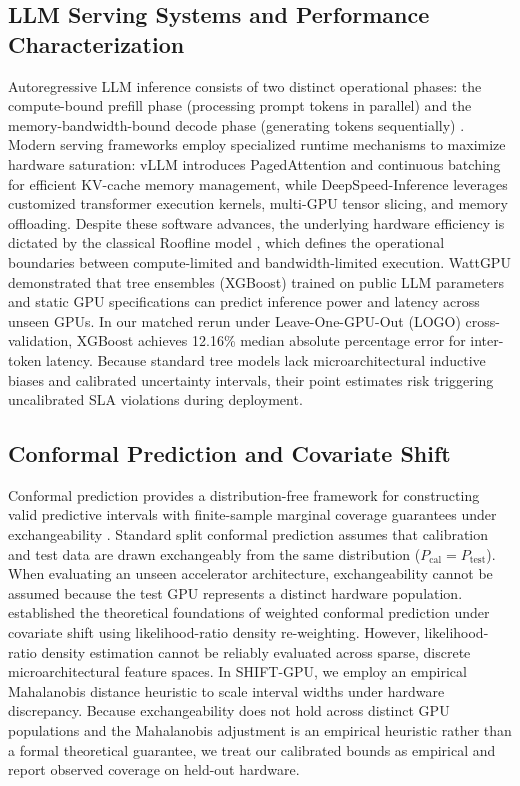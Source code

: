 \documentclass[preprint,12pt]{elsarticle}
\begin{document}
\subsection{LLM Serving Systems and Performance Characterization}
Autoregressive LLM inference consists of two distinct operational phases: the compute-bound prefill phase (processing prompt tokens in parallel) and the memory-bandwidth-bound decode phase (generating tokens sequentially) \citep{kwon2023vllm}. Modern serving frameworks employ specialized runtime mechanisms to maximize hardware saturation: vLLM \citep{kwon2023vllm} introduces PagedAttention and continuous batching for efficient KV-cache memory management, while DeepSpeed-Inference \citep{aminabadi2022deepspeed} leverages customized transformer execution kernels, multi-GPU tensor slicing, and memory offloading. Despite these software advances, the underlying hardware efficiency is dictated by the classical Roofline model \citep{williams2009roofline}, which defines the operational boundaries between compute-limited and bandwidth-limited execution. WattGPU \citep{fadel2026wattgpu} demonstrated that tree ensembles (XGBoost) trained on public LLM parameters and static GPU specifications can predict inference power and latency across unseen GPUs. In our matched rerun under Leave-One-GPU-Out (LOGO) cross-validation, XGBoost achieves 12.16\% median absolute percentage error for inter-token latency. Because standard tree models lack microarchitectural inductive biases and calibrated uncertainty intervals, their point estimates risk triggering uncalibrated SLA violations during deployment.

\subsection{Conformal Prediction and Covariate Shift}
Conformal prediction provides a distribution-free framework for constructing valid predictive intervals with finite-sample marginal coverage guarantees under exchangeability \citep{angelopoulos2023conformal}. Standard split conformal prediction assumes that calibration and test data are drawn exchangeably from the same distribution ($P_{\text{cal}} = P_{\text{test}}$). When evaluating an unseen accelerator architecture, exchangeability cannot be assumed because the test GPU represents a distinct hardware population. \citet{tibshirani2019conformal_covariate} established the theoretical foundations of weighted conformal prediction under covariate shift using likelihood-ratio density re-weighting. However, likelihood-ratio density estimation cannot be reliably evaluated across sparse, discrete microarchitectural feature spaces. In SHIFT-GPU, we employ an empirical Mahalanobis distance heuristic to scale interval widths under hardware discrepancy. Because exchangeability does not hold across distinct GPU populations and the Mahalanobis adjustment is an empirical heuristic rather than a formal theoretical guarantee, we treat our calibrated bounds as empirical and report observed coverage on held-out hardware.
\end{document}
